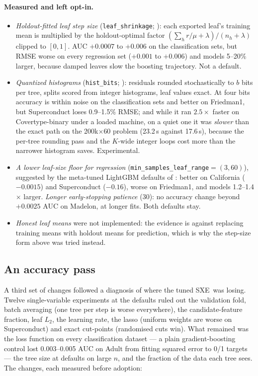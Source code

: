 \documentclass[11pt,a4paper]{article}
\newcommand{\code}[1]{\texttt{\small #1}}
\newcommand{\SXE}{\textsc{SXE}}
\theoremstyle{definition}
\begin{document}
\paragraph{Measured and left opt-in.}
\begin{itemize}[leftmargin=1.5em,itemsep=2pt]
\item \emph{Holdout-fitted leaf step size} (\code{leaf\_shrinkage};
\cite{park2018paloboost}): each exported leaf's training mean is multiplied by
the holdout-optimal factor $(\sum_h r/\mu + \lambda)/(n_h + \lambda)$ clipped
to $[0,1]$. AUC $+0.0007$ to $+0.006$ on the classification sets, but RMSE
worse on every regression set ($+0.001$ to $+0.006$) and models 5--20\%
larger, because damped leaves slow the boosting trajectory. Not a default.
\item \emph{Quantized histograms} (\code{hist\_bits};
\cite{shi2022quantized}): residuals rounded stochastically to $b$ bits per
tree, splits scored from integer histograms, leaf values exact. At four bits
accuracy is within noise on the classification sets and better on Friedman1,
but Superconduct loses 0.9--1.5\% RMSE; and while it ran $2.5\times$ faster on
Covertype-binary under a loaded machine, on a quiet one it was \emph{slower}
than the exact path on the 200k$\times$60 problem (23.2\,s against 17.6\,s),
because the per-tree rounding pass and the $K$-wide integer loops cost more
than the narrower histogram saves. Experimental.
\item \emph{A lower leaf-size floor for regression}
(\code{min\_samples\_leaf\_range}$=(3,60)$), suggested by the meta-tuned
LightGBM defaults of \cite{holzmuller2024better}: better on California
($-0.0015$) and Superconduct ($-0.16$), worse on Friedman1, and models
1.2--1.4$\times$ larger. \emph{Longer early-stopping patience} (30): no
accuracy change beyond $+0.0025$ AUC on Madelon, at longer fits. Both defaults
stay.
\item \emph{Honest leaf means} were not implemented: the evidence
\cite{hou2025honesty,fang2025inference} is against replacing training means
with holdout means for prediction, which is why the step-size form above was
tried instead.
\end{itemize}

\subsection{An accuracy pass}\label{sec:accpass}

A third set of changes followed a diagnosis of where the tuned \SXE\ was
losing. Twelve single-variable experiments at the defaults ruled out the
validation fold, batch averaging (one tree per step is worse everywhere),
the candidate-feature fraction, leaf $L_2$, the learning rate, the lasso
(uniform weights are worse on Superconduct) and exact cut-points
(randomised cuts win). What remained was the loss function on every
classification dataset --- a plain gradient-boosting control lost 0.003--0.005
AUC on Adult from fitting squared error to 0/1 targets --- the tree size at
defaults on large $n$, and the fraction of the data each tree sees. The
changes, each measured before adoption:
\end{document}
